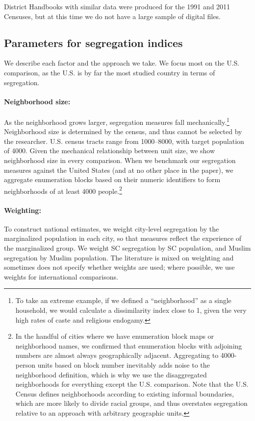 \documentclass[12pt]{article}
\begin{document}
  District Handbooks with similar data were produced for the 1991 and 2011 Censuses, but at this time we do not have a large sample of digital files. 
  
  \subsection{Parameters for segregation indices}
  \label{sec:app_seg_def}
  We describe each factor and the approach we take. We focus most on the U.S. comparison, as the U.S. is by far the most studied country in terms of segregation.

 \paragraph{Neighborhood size:} As the neighborhood grows larger, segregation measures fall mechanically.\footnote{To take an extreme example, if we defined a ``neighborhood'' as a single household, we would calculate a dissimilarity index close to 1, given the very high rates of caste and religious endogamy.} Neighborhood size is determined by the census, and thus cannot be selected by the researcher. U.S. census tracts range from 1000--8000, with target population of 4000. Given the mechanical relationship between unit size, we show neighborhood size in every comparison. When we benchmark our segregation measures against the United States (and at no other place in the paper), we aggregate enumeration blocks based on their numeric identifiers to form neighborhoods of at least 4000 people.\footnote{In the handful of cities where we have enumeration block maps or neighborhood names, we confirmed that enumeration blocks with adjoining numbers are almost always geographically adjacent. Aggregating to 4000-person units based on block number inevitably adds noise to the neighborhood definition, which is why we use the disaggregated neighborhoods for everything except the U.S. comparison. Note that the U.S. Census defines neighborhoods according to existing informal boundaries, which are more likely to divide racial groups, and thus overstates segregation relative to an approach with arbitrary geographic units.}

 \paragraph{Weighting:} To construct national estimates, we weight city-level segregation by the marginalized population in each city, so that measures reflect the experience of the marginalized group. We weight SC segregation by SC population, and Muslim segregation by Muslim population. The literature is mixed on weighting and sometimes does not specify whether weights are used; where possible, we use weights for international comparisons.
\end{document}
